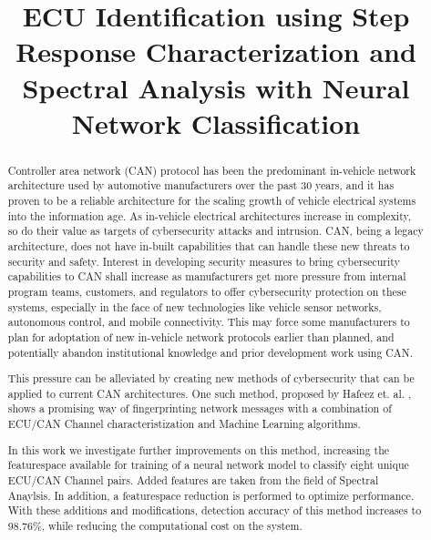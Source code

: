 \documentclass[conference]{IEEEtran}
\begin{document}
\title{ECU Identification using
Step Response Characterization and Spectral Analysis with Neural Network Classification\\
{\footnotesize \textsuperscript{}}
}

\author{

\and

}

\maketitle
\begin{abstract}
Controller area network (CAN) protocol has been the predominant in-vehicle network architecture used by automotive manufacturers over the past 30 years, and it has proven to be a reliable architecture for the scaling growth of vehicle electrical systems into the information age. As in-vehicle electrical architectures increase in complexity, so do their value as targets of cybersecurity attacks and intrusion. CAN, being a legacy architecture, does not have in-built capabilities that can handle these new threats to security and safety. Interest in developing security measures to bring cybersecurity capabilities to CAN shall increase as manufacturers get more pressure from internal program teams, customers, and regulators to offer cybersecurity protection on these systems, especially in the face of new technologies like vehicle sensor networks, autonomous control, and mobile connectivity. This may force some manufacturers to plan for adoptation of new in-vehicle network protocols earlier than planned, and potentially abandon institutional knowledge and prior development work using CAN.

This pressure can be alleviated by creating new methods of cybersecurity that can be applied to current CAN architectures. One such method, proposed by Hafeez et. al. \cite{hafeez2019}, shows a promising way of fingerprinting network messages with a combination of ECU/CAN Channel characteristization and Machine Learning algorithms.

In this work we investigate further improvements on this method, increasing the featurespace available for training of a neural network model to classify eight unique ECU/CAN Channel pairs. Added features are taken from the field of Spectral Anaylsis. In addition, a featurespace reduction is performed to optimize performance. With these additions and modifications, detection accuracy of this method increases to 98.76\%, while reducing the computational cost on the system.
\medbreak
\end{abstract}
\end{document}
